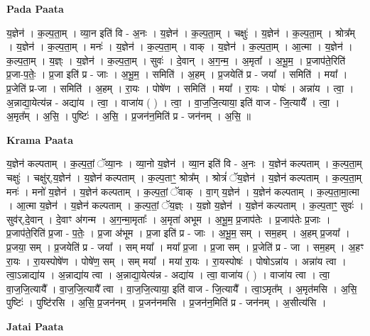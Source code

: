 \documentclass[17pt]{extarticle}
\begin{document}
\textbf{Pada Paata} \newline

य॒ज्ञेन॑ । क॒ल्प॒ता॒म् । व्या॒न इति॑ वि - अ॒नः । य॒ज्ञेन॑ । क॒ल्प॒ता॒म् । चक्षुः॑ । य॒ज्ञेन॑ । क॒ल्प॒ता॒म् । श्रोत्र᳚म् । य॒ज्ञेन॑ । क॒ल्प॒ता॒म् । मनः॑ । य॒ज्ञेन॑ । क॒ल्प॒ता॒म् । वाक् । य॒ज्ञेन॑ । क॒ल्प॒ता॒म् । आ॒त्मा । य॒ज्ञेन॑ । क॒ल्प॒ता॒म् । य॒ज्ञ्ः । य॒ज्ञेन॑ । क॒ल्प॒ता॒म् । सुवः॑ । दे॒वान् । अ॒ग॒न्म॒ । अ॒मृता᳚ । अ॒भू॒म॒ । प्र॒जाप॑ते॒रिति॑ प्र॒जा-प॒तेः॒ । प्र॒जा इति॑ प्र - जाः । अ॒भू॒म॒ । समिति॑ । अ॒हम् । प्र॒जयेति॑ प्र - जया᳚ । समिति॑ । मया᳚ । प्र॒जेति॑ प्र-जा । समिति॑ । अ॒हम् । रा॒यः । पोषे॑ण । समिति॑ । मया᳚ । रा॒यः । पोषः॑ । अन्ना॑य । त्वा॒ । अ॒न्नाद्या॒येत्य॑न्न - अद्या॑य । त्वा॒ । वाजा॑य ( ) । त्वा॒ । वा॒ज॒जि॒त्याया॒ इति॑ वाज - जि॒त्यायै᳚ । त्वा॒ । अ॒मृत᳚म् । अ॒सि॒ । पुष्टिः॑ । अ॒सि॒ । प्र॒जन॑न॒मिति॑ प्र - जन॑नम् । अ॒सि॒ ॥  \newline


\textbf{Krama Paata} \newline

य॒ज्ञेन॑ कल्पताम् । क॒ल्प॒तां॒ ॅव्या॒नः । व्या॒नो य॒ज्ञेन॑ । व्या॒न इति॑ वि - अ॒नः । य॒ज्ञेन॑ कल्पताम् । क॒ल्प॒ता॒म् चक्षुः॑ । चक्षु॑र्,य॒ज्ञेन॑ । य॒ज्ञेन॑ कल्पताम् । क॒ल्प॒ताꣳ॒॒ श्रोत्र᳚म् । श्रोत्रं॑ ॅय॒ज्ञेन॑ । य॒ज्ञेन॑ कल्पताम् । क॒ल्प॒ता॒म् मनः॑ । मनो॑ य॒ज्ञेन॑ । य॒ज्ञेन॑ कल्पताम् । क॒ल्प॒तां॒ ॅवाक् । वा॒ग् य॒ज्ञेन॑ । य॒ज्ञेन॑ कल्पताम् । क॒ल्प॒ता॒मा॒त्मा । आ॒त्मा य॒ज्ञेन॑ । य॒ज्ञेन॑ कल्पताम् । क॒ल्प॒तां॒ ॅय॒ज्ञ्ः । य॒ज्ञो य॒ज्ञेन॑ । य॒ज्ञेन॑ कल्पताम् । क॒ल्प॒ताꣳ॒॒ सुवः॑ । सुव॑र्,दे॒वान् । दे॒वाꣳ अ॑गन्म । अ॒ग॒न्मा॒मृताः᳚ । अ॒मृता॑ अभूम । अ॒भू॒म॒ प्र॒जाप॑तेः । प्र॒जाप॑तेः प्र॒जाः । प्र॒जाप॑ते॒रिति॑ प्र॒जा - प॒तेः॒ । प्र॒जा अ॑भूम । प्र॒जा इति॑ प्र - जाः । अ॒भू॒म॒ सम् । सम॒हम् । अ॒हम् प्र॒जया᳚ । प्र॒जया॒ सम् । प्र॒जयेति॑ प्र - जया᳚ । सम् मया᳚ । मया᳚ प्र॒जा । प्र॒जा सम् । प्र॒जेति॑ प्र - जा । सम॒हम् । अ॒हꣳ रा॒यः । रा॒यस्पोषे॑ण । पोषे॑ण॒ सम् । सम् मया᳚ । मया॑ रा॒यः । रा॒यस्पोषः॑ । पोषोऽन्ना॑य । अन्ना॑य त्वा । त्वा॒ऽन्नाद्या॑य । अ॒न्नाद्या॑य त्वा । अ॒न्नाद्या॒येत्य॑न्न - अद्या॑य । त्वा॒ वाजा॑य ( ) । वाजा॑य त्वा । त्वा॒ वा॒ज॒जि॒त्यायै᳚ । वा॒ज॒जि॒त्यायै᳚ त्वा । वा॒ज॒जि॒त्याया॒ इति॑ वाज - जि॒त्यायै᳚ । त्वा॒ऽमृत᳚म् । अ॒मृत॑मसि । अ॒सि॒ पुष्टिः॑ । पुष्टि॑रसि । अ॒सि॒ प्र॒जन॑नम् । प्र॒जन॑नमसि । प्र॒जन॑न॒मिति॑ प्र - जन॑नम् । अ॒सीत्य॑सि । \newline

\textbf{Jatai Paata} \newline
\end{document}
